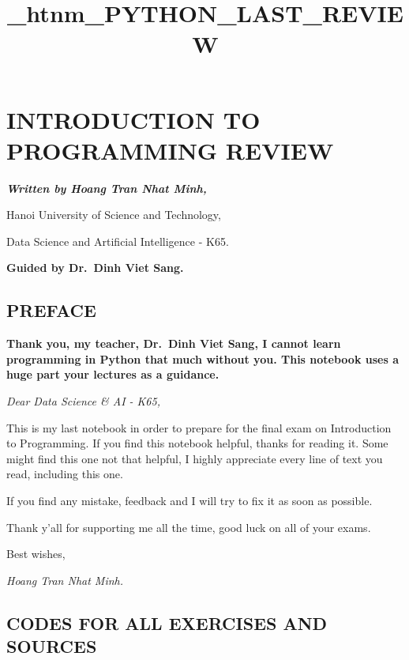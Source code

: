 \documentclass[11pt]{article}
\title{\_htnm\_PYTHON\_LAST\_REVIEW}
\begin{document}
    
    \maketitle
    
    

    
    \hypertarget{introduction-to-programming-review}{%
\section{\texorpdfstring{\textbf{INTRODUCTION TO PROGRAMMING
REVIEW}}{INTRODUCTION TO PROGRAMMING REVIEW}}\label{introduction-to-programming-review}}

\textbf{\emph{Written by Hoang Tran Nhat Minh,}}

Hanoi University of Science and Technology,

Data Science and Artificial Intelligence - K65.

\textbf{Guided by Dr.~Dinh Viet Sang.}

    \hypertarget{preface}{%
\subsection{PREFACE}\label{preface}}

    \textbf{Thank you, my teacher, Dr.~Dinh Viet Sang, I cannot learn
programming in Python that much without you. This notebook uses a huge
part your lectures as a guidance.}

\emph{Dear Data Science \& AI - K65,}

This is my last notebook in order to prepare for the final exam on
Introduction to Programming. If you find this notebook helpful, thanks
for reading it. Some might find this one not that helpful, I highly
appreciate every line of text you read, including this one.

If you find any mistake, feedback and I will try to fix it as soon as
possible.

Thank y'all for supporting me all the time, good luck on all of your
exams.

Best wishes,

\emph{Hoang Tran Nhat Minh.}

    \hypertarget{codes-for-all-exercises-and-sources}{%
\subsection{CODES FOR ALL EXERCISES AND
SOURCES}\label{codes-for-all-exercises-and-sources}}
\end{document}
